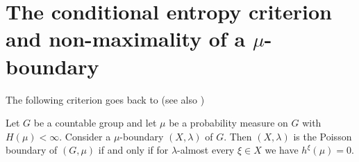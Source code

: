 \section{The conditional entropy criterion and non-maximality of a $\mu$-boundary}

The following criterion goes back to \cite[Theorem 2]{Kaimanovich1985} (see also \cite[Theorem 4.6]{Kaimanovich2000})
\begin{thm} Let $G$ be a countable group and let $\mu$ be a probability measure on $G$ with $H(\mu)<\infty$. Consider a $\mu$-boundary $(X,\lambda)$ of $G$. Then $(X,\lambda)$ is the Poisson boundary of $(G,\mu)$ if and only if for $\lambda$-almost every $\xi\in X$ we have $h^{\xi}(\mu)=0$.
\end{thm}